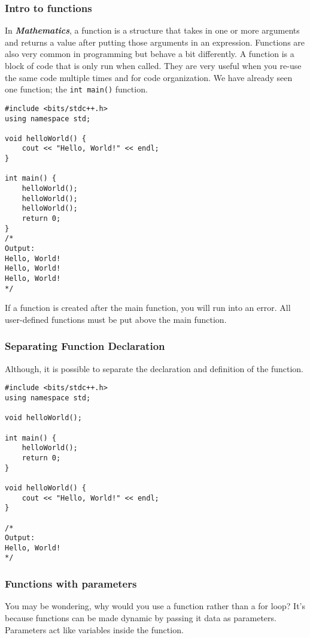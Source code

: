 \documentclass{report}
\begin{document}
\subsubsection{Intro to functions}
In \textbf{\textit{Mathematics}}, a function is a structure that takes in one or more arguments and returns a value after putting those arguments in an expression. Functions are also very common in programming but behave a bit differently. A function is a block of code that is only run when called. They are very useful when you re-use the same code multiple times and for code organization. We have already seen one function; the \lstinline{int main()} function.

\begin{lstlisting}
#include <bits/stdc++.h>
using namespace std;

void helloWorld() {
    cout << "Hello, World!" << endl;
}

int main() {
    helloWorld();
    helloWorld();
    helloWorld();
    return 0;
}
/*
Output:
Hello, World!
Hello, World!
Hello, World!
*/
\end{lstlisting}

\begin{note}
    If a function is created after the main function, you will run into an error. All user-defined functions must be put above the main function.
\end{note}

\subsubsection{Separating Function Declaration}
Although, it is possible to separate the declaration and definition of the function.

\begin{lstlisting}
#include <bits/stdc++.h>
using namespace std;

void helloWorld();

int main() {
    helloWorld();
    return 0;
}

void helloWorld() {
    cout << "Hello, World!" << endl;
}

/*
Output:
Hello, World!
*/
\end{lstlisting}

\subsubsection{Functions with parameters}
You may be wondering, why would you use a function rather than a for loop? It's because functions can be made dynamic by passing it data as parameters. Parameters act like variables inside the function.
\end{document}
